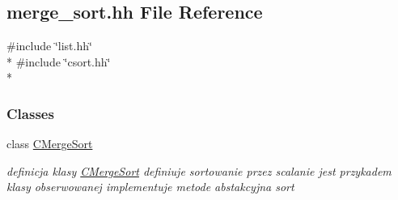 \hypertarget{merge__sort_8hh}{}\subsection{merge\+\_\+sort.\+hh File Reference}
\label{merge__sort_8hh}
{\ttfamily \#include \char`\"{}list.\+hh\char`\"{}}\\*
{\ttfamily \#include \char`\"{}csort.\+hh\char`\"{}}\\*
\subsubsection*{Classes}
\begin{DoxyCompactItemize}
\item 
class \hyperlink{class_c_merge_sort}{C\+Merge\+Sort}
\begin{DoxyCompactList}\small\item\em definicja klasy \hyperlink{class_c_merge_sort}{C\+Merge\+Sort} definiuje sortowanie przez scalanie jest przykadem klasy obserwowanej implementuje metode abstakcyjna sort \end{DoxyCompactList}\end{DoxyCompactItemize}
